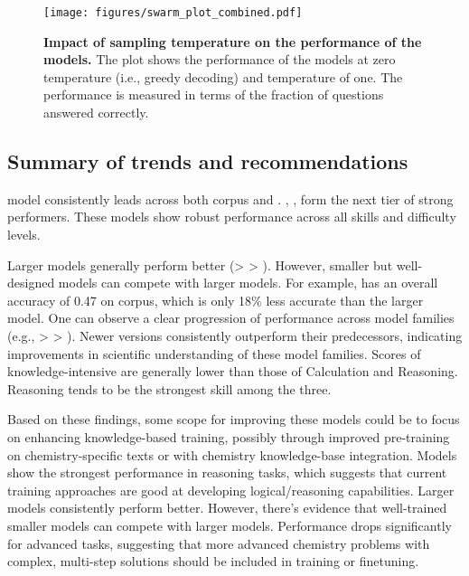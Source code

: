 \begin{figure}[!h]
    \centering
    \texttt{[image: figures/swarm\_plot\_combined.pdf]}
    \caption{\textbf{Impact of sampling temperature on the performance of the models.} The plot shows the performance of the models at zero temperature (i.e., greedy decoding) and temperature of one. The performance is measured in terms of the fraction of questions answered correctly.}
    \label{fig:temperature_impact}
\end{figure}


\clearpage
\subsection{Summary of trends and recommendations}

\oone model consistently leads across both \ChemBench corpus and \chembenchmini.  \ClaudeThreeFiveSonnet, \GPTFourO, \LlamaThreeOneFourZeroFiveBInstruct form the next tier of strong performers. These models show robust performance across all skills and difficulty levels. 

Larger models generally perform better (\LlamaThreeOneFourZeroFiveBInstruct > \LlamaThreeOneSeventyBInstruct > \LlamaThreeOneEightBInstruct). However, smaller but well-designed models can compete with larger models. For example, \GemmaTwoNineBIt has an overall accuracy of 0.47 on \ChemBench corpus, which is only 18\% less accurate than the larger \LlamaThreeOneEightBInstruct model.
One can observe a clear progression of performance across model families (e.g., \ClaudeThreeFiveSonnet >  \ClaudeThree > \ClaudeTwo). Newer versions consistently outperform their predecessors, indicating improvements in scientific understanding of these model families.
Scores of knowledge-intensive are generally lower than those of Calculation and Reasoning. Reasoning tends to be the strongest skill among the three.

Based on these findings, some scope for improving these models could be to focus on enhancing knowledge-based training, possibly through improved pre-training on chemistry-specific texts or with chemistry knowledge-base integration. 
Models show the strongest performance in reasoning tasks, which suggests that current training approaches are good at developing logical/reasoning capabilities. Larger models consistently perform better. However, there's evidence that well-trained smaller models can compete with larger models. 
Performance drops significantly for advanced tasks, suggesting that more advanced chemistry problems with complex, multi-step solutions should be included in training or finetuning.

